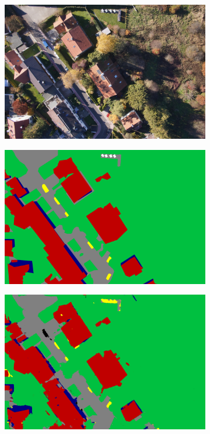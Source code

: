 \begin{figure}[htb]
\begin{subfigure}{0.243\columnwidth}
  \centering
  \includegraphics[width=1\linewidth]{fig/segmentation/DSC00855.JPG}
  \caption{}
\end{subfigure}
\begin{subfigure}{0.243\columnwidth}
  \centering
  \includegraphics[width=1\linewidth]{fig/segmentation/DSC00855.png}
  \caption{}
\end{subfigure}
\begin{subfigure}{0.243\columnwidth}
  \centering
  \includegraphics[width=1\linewidth]{fig/segmentation/DSC00855_6000_manualcrf.png}

\end{subfigure}
\end{figure}
